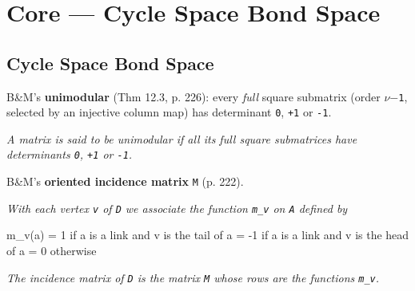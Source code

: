\section{Core --- Cycle Space Bond Space}
\subsection{Cycle Space Bond Space}


\begin{definition}
\label{Matrix.IsUnimodular}
\leanok
B\&M's \textbf{unimodular} (Thm 12.3, p. 226): every \emph{full} square submatrix (order
\texttt{$\nu$$-$1},
selected by an injective column map) has determinant \texttt{0}, \texttt{+1} or
\texttt{-1}.

\emph{A matrix is said to be unimodular if all
its full square submatrices have determinants \texttt{0}, \texttt{+1} or \texttt{-1}.}
\end{definition}

\begin{definition}
\label{CycleSpace.orientedIncMatrix}
\leanok
B\&M's \textbf{oriented incidence matrix} \texttt{M} (p. 222).

\emph{With each vertex \texttt{v} of \texttt{D} we associate
the function \texttt{m\_v} on \texttt{A} defined by}

m\_v(a) = 1   if a is a link and v is the tail of a
           = -1  if a is a link and v is the head of a
           = 0   otherwise

\emph{The incidence matrix of \texttt{D} is the matrix \texttt{M} whose rows are the
functions \texttt{m\_v}.}
\end{definition}

